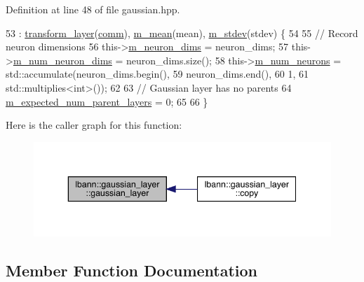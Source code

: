 Definition at line 48 of file gaussian.\+hpp.


\begin{DoxyCode}
53     : \hyperlink{classlbann_1_1transform__layer_a4b72501e0f4d0745c8b13c5331055e65}{transform\_layer}(\hyperlink{file__io_8cpp_ab048c6f9fcbcfaa57ce68b00263dbebe}{comm}), \hyperlink{classlbann_1_1gaussian__layer_a397a47df5968e58fd1fcbfcdc2a3a620}{m\_mean}(mean), \hyperlink{classlbann_1_1gaussian__layer_a42dc22c72a46ed4538b7776e24eb0a40}{m\_stdev}(stdev) \{
54 
55     \textcolor{comment}{// Record neuron dimensions}
56     this->\hyperlink{classlbann_1_1Layer_abb34bb8031f57a483e2e327a5f229f48}{m\_neuron\_dims} = neuron\_dims;
57     this->\hyperlink{classlbann_1_1Layer_adfd6178d21498c9095cd947ae1eb2d6a}{m\_num\_neuron\_dims} = neuron\_dims.size();
58     this->\hyperlink{classlbann_1_1Layer_a6b5ebc8a7d9329d8a773ed787e7b41d8}{m\_num\_neurons} = std::accumulate(neuron\_dims.begin(),
59                                           neuron\_dims.end(),
60                                           1,
61                                           std::multiplies<int>());
62 
63     \textcolor{comment}{// Gaussian layer has no parents}
64     \hyperlink{classlbann_1_1Layer_a841b96b25555247f52921c7f13ae1dfa}{m\_expected\_num\_parent\_layers} = 0;
65 
66   \}
\end{DoxyCode}
Here is the caller graph for this function\+:\nopagebreak
\begin{figure}[H]
\begin{center}
\leavevmode
\includegraphics[width=343pt]{classlbann_1_1gaussian__layer_af130978295e70d9d6521bf998052d298_icgraph}
\end{center}
\end{figure}


\subsection{Member Function Documentation}
\mbox{\label{classlbann_1_1gaussian__layer_ab6b5330343feb76668ecac4d5b705d41}} 
